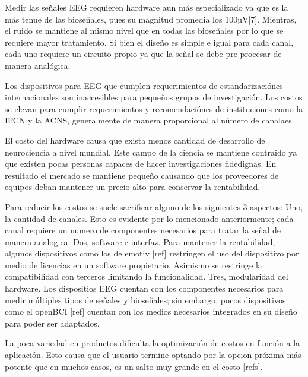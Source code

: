 Medir las señales EEG requieren hardware aun más especializado ya que es la más tenue de las bioseñales, pues su magnitud promedia los 100µV[7]. Mientras, el ruido se mantiene al mismo nivel que en todas las bioseñales por lo que se requiere mayor tratamiento. Si bien el diseño es simple e igual para cada canal, cada uno requiere un circuito propio ya que la señal se debe pre-procesar de manera analógica.

Los dispositivos para EEG que cumplen requerimientos de estandarizaciónes internacionales son inaccesibles para pequeños grupos de investigación. Los costos se elevan para cumplir requerimientos y recomendaciónes de instituciones como la IFCN y la ACNS, generalmente de manera proporcional al número de canalaes.

El costo del hardware causa que exista menos cantidad de desarrollo de neurociencia a nivel mundial. Este campo de la ciencia se mantiene contraido ya que existen pocas personas capaces de hacer investigaciones fidedignas. En resultado el mercado se mantiene pequeño causando que los proveedores de equipos deban mantener un precio alto para conservar la rentabilidad.

Para reducir los costos se suele sacrificar alguno de los siguientes 3 aspectos: Uno, la cantidad de canales. Esto es evidente por lo mencionado anteriormente; cada canal requiere un numero de componentes necesarios para tratar la señal de manera analogica. Dos, software e interfaz. Para mantener la rentabilidad, algunos dispositivos como los de emotiv [ref] restringen el uso del dispositivo por medio de licencias en un software propietario. Asimismo se restringe la compatibilidad con terceros limitando la funcionalidad. Tres, modularidad del hardware. Los dispositios EEG cuentan con los componentes necesarios para medir múltiples tipos de señales y bioseñales; sin embargo, pocos dispositivos como el openBCI [ref] cuentan con los medios necesarios integrados en su diseño para poder ser adaptados.

La poca variedad en productos dificulta la optimización de costos en función a la aplicación. Esto causa que el usuario termine optando por la opcion próxima más potente que en muchos casos, es un salto muy grande en el costo [refs].

